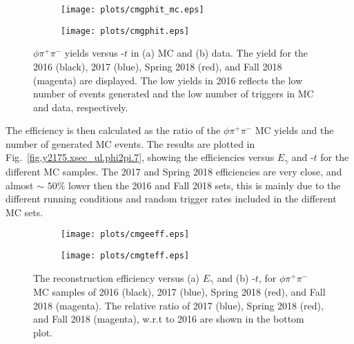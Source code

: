 \begin{figure}[H]
    \centering
    \begin{subfigure}[b]{0.5\textwidth}
        \texttt{[image: plots/cmgphit\_mc.eps]}
        \caption{}
        \label{fig.y2175.xsec_ul.phi2pi.8.a}
    \end{subfigure}\hfill
    \begin{subfigure}[b]{0.5\textwidth}
        \texttt{[image: plots/cmgphit.eps]}
        \caption{}
        \label{fig.y2175.xsec_ul.phi2pi.8.b}
    \end{subfigure}
    \caption{\label{fig.y2175.xsec_ul.phi2pi.8}$\phi \pi^+ \pi^-$ yields versus -$t$ in (a) MC and (b) data. The yield for the 2016 (black), 2017 (blue), Spring 2018 (red), and Fall 2018 (magenta) are displayed. The low yields in 2016 reflects the low number of events generated and the low number of triggers in MC and data, respectively.}
\end{figure}

The efficiency is then calculated as the ratio of the $\phi \pi^+ \pi^-$ MC yields and the number of generated MC events. The results are plotted in Fig.~\ref{fig.y2175.xsec_ul.phi2pi.7}, showing the efficiencies versus $E_{\gamma}$ and -$t$ for the different MC samples. The 2017 and Spring 2018 efficiencies are very close, and almost $\sim$ $50\%$ lower then the 2016 and Fall 2018 sets, this is mainly due to the different running conditions and random trigger rates included in the different MC sets.

\begin{figure}[H]
    \centering
    \begin{subfigure}[b]{0.5\textwidth}
        \texttt{[image: plots/cmgeeff.eps]}
        \caption{}
        \label{fig.y2175.xsec_ul.phi2pi.9.a}
    \end{subfigure}\hfill
    \begin{subfigure}[b]{0.5\textwidth}
        \texttt{[image: plots/cmgteff.eps]}
        \caption{}
        \label{fig.y2175.xsec_ul.phi2pi.9.b}
    \end{subfigure}
    \caption{\label{fig.y2175.xsec_ul.phi2pi.9}The reconstruction efficiency versus (a) $E_{\gamma}$ and (b) -$t$, for $\phi \pi^+ \pi^-$ MC samples of 2016 (black), 2017 (blue), Spring 2018 (red), and Fall 2018 (magenta). The relative ratio of 2017 (blue), Spring 2018 (red), and Fall 2018 (magenta), w.r.t to 2016 are shown in the bottom plot.}
\end{figure}

